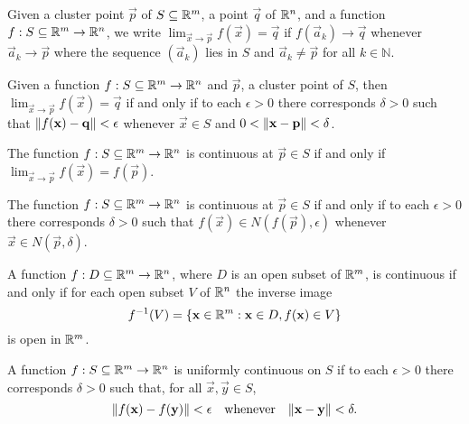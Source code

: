 \documentclass{article}
\begin{document}
\begin{definition}[Limit]
    Given a cluster point $\vec{p}$ of $S \subseteq \mathbb{R}^m$, a point $\vec{q}$ of $\mathbb{R}^n$,
    and a function ${f: S \subseteq \mathbb{R}^m \rightarrow \mathbb{R}^n}$, we write
    ${\lim_{\vec{x} \rightarrow \vec{p}} f(\vec{x})} = \vec{q}$
    if $f(\vec{a}_k) \rightarrow \vec{q}$ whenever $\vec{a}_k \rightarrow \vec{p}$ where the sequence
    $(\vec{a}_k)$ lies in $S$ and $\vec{a}_k \neq \vec{p}$ for all $k \in \mathbb{N}$.
\end{definition}

\begin{theorem}
    Given a function ${f: S \subseteq \mathbb{R}^m \rightarrow \mathbb{R}^n}$ and $\vec{p}$, a cluster point of $S$,
    then $\lim_{\vec{x} \rightarrow \vec{p}} f(\vec{x}) = \vec{q}$ if and only if to each $\epsilon > 0$ there corresponds
    $\delta > 0$ such that $\lVert f(\mathbf{x}) - \mathbf{q}\rVert < \epsilon$ whenever $\vec{x} \in S$ and
    $0 < \lVert\mathbf{x} - \mathbf{p}\rVert < \delta$.
\end{theorem}

\begin{theorem}
    The function ${f: S \subseteq \mathbb{R}^m \rightarrow \mathbb{R}^n}$ is continuous at $\vec{p} \in S$
    if and only if  $\lim_{\vec{x} \rightarrow \vec{p}} f(\vec{x}) = f(\vec{p})$.
\end{theorem}

\begin{theorem}
    The function ${f: S \subseteq \mathbb{R}^m \rightarrow \mathbb{R}^n}$ is continuous at $\vec{p} \in S$
    if and only if to each $\epsilon > 0$ there corresponds $\delta > 0$ such that $f(\vec{x}) \in N(f(\vec{p}), \epsilon)$
    whenever $\vec{x} \in N(\vec{p}, \delta)$.
\end{theorem}

\begin{theorem}
    A function ${f: D \subseteq \mathbb{R}^m \rightarrow \mathbb{R}^n}$, where $D$ is an
    open subset of $\mathbb{R}^m$, is continuous if and only if for each open subset $V$
    of $\mathbb{R}^n$ the inverse image
    \begin{equation*}
        f^{-1}(V) = \{\mathbf{x} \in \mathbb{R}^m : \mathbf{x} \in D, f(\mathbf{x}) \in V\}
    \end{equation*}
    is open in $\mathbb{R}^m$.
\end{theorem}

\begin{theorem}
    A function ${f: S \subseteq \mathbb{R}^m \rightarrow \mathbb{R}^n}$ is uniformly continuous
    on $S$ if to each $\epsilon > 0$ there corresponds $\delta > 0$ such that, for all
    $\vec{x}, \vec{y} \in S$,
    \begin{equation*}
        \lVert f(\mathbf{x}) - f(\mathbf{y})\rVert < \epsilon \quad \textnormal{whenever} \quad \lVert\mathbf{x} - \mathbf{y}\rVert < \delta.
    \end{equation*}
\end{theorem}
\end{document}
